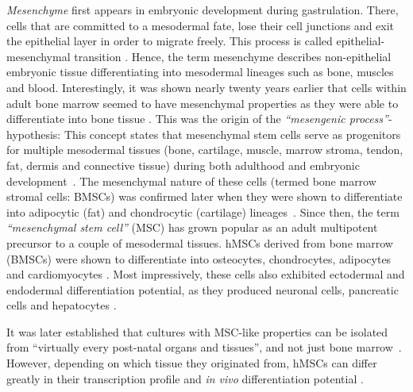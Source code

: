 \emph{Mesenchyme} first appears in embryonic development during gastrulation.
There, cells that are committed to a mesodermal fate, lose their cell junctions
and exit the epithelial layer in order to migrate freely. This process is called
epithelial-mesenchymal transition
\cite{tamFormationMesodermalTissues1987,nowotschinCellularDynamicsEarly2010}.
Hence, the term mesenchyme describes non-epithelial embryonic tissue
differentiating into mesodermal lineages such as bone, muscles and blood.
Interestingly, it was shown nearly twenty years earlier that cells within adult
bone marrow seemed to have mesenchymal properties as they were able to
differentiate into bone tissue
\cite{friedensteinOsteogenesisTransplantsBone1966,friedensteinOsteogenicPrecursorCells1971,biancoMesenchymalStemCells2014}.
This was the origin of the \emph{``mesengenic process''}-hypothesis: This
concept states that mesenchymal stem cells serve as progenitors for multiple
mesodermal tissues (bone, cartilage, muscle, marrow stroma, tendon, fat, dermis
and connective tissue) during both adulthood and embryonic
development~\cite{caplanMesenchymalStemCells1991,caplanMesengenicProcess1994}.
The mesenchymal nature of these cells (termed bone marrow stromal cells: BMSCs)
was confirmed later when they were shown to differentiate into adipocytic (fat)
and chondrocytic (cartilage)
lineages~\cite{pittengerMultilineagePotentialAdult1999}. Since then, the term
\emph{``mesenchymal stem cell''} (MSC) has grown popular as an adult multipotent
precursor to a couple of mesodermal tissues. hMSCs derived from bone marrow
(BMSCs) were shown to differentiate into osteocytes, chondrocytes, adipocytes
and cardiomyocytes \cite{gronthosSTRO1FractionAdult1994,
    muruganandanAdipocyteDifferentiationBone2009, xuMesenchymalStemCells2004}. Most
impressively, these cells also exhibited ectodermal and endodermal
differentiation potential, as they produced neuronal cells, pancreatic cells and
hepatocytes \cite{barzilayLentiviralDeliveryLMX1a2009,
    wilkinsHumanBoneMarrowderived2009, gabrInsulinproducingCellsAdult2013,
    stockHumanBoneMarrow2014}.

It was later established that cultures with MSC-like
properties can be isolated from ``virtually every post-natal organs and
tissues'', and not just bone
marrow~\cite{dasilvameirellesMesenchymalStemCells2006}. However, depending on
which tissue they originated from, hMSCs can differ greatly in their
transcription profile and \textit{in vivo} differentiation potential
\cite{jansenFunctionalDifferencesMesenchymal2010,sacchettiNoIdenticalMesenchymal2016}.

